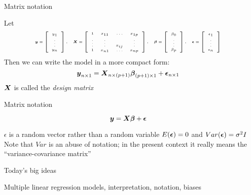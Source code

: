 \documentclass[table]{beamer}\usepackage[]{graphicx}\usepackage[]{color}
\begin{document}
\begin{frame}{Matrix notation}

\bi
	\myitem Let
	\begin{displaymath}\tiny
	\boldsymbol{y} = \left[
		\begin{array}{c}
		y_1 \\
		\vdots \\
		y_n \\
		\end{array}
    		\right],\quad
	\boldsymbol{X} = \left[
		\begin{array}{cccc}
		1 & x_{11} & \hdots & x_{1p} \\
		\vdots & \vdots & x_{ij} & \vdots \\
		1 & x_{n1} & \hdots & x_{np} \\
		\end{array}
		\right], \quad
	\boldsymbol{\beta} = \left[
		\begin{array}{c}
		\beta_0 \\
		\vdots \\
		\beta_p \\
		\end{array}
		\right], \quad
         \boldsymbol{\epsilon} = \left[
		\begin{array}{c}
		\epsilon_1 \\
		\vdots \\
		\epsilon_n \\
		\end{array}
		\right]
	\end{displaymath}
	\bigskip
	\myitem Then we can write the model in a more compact form:
	$${\boldsymbol{y}}_{n \times 1} = {\boldsymbol{X}}_{n \times (p+1)}{\boldsymbol{\beta}}_{(p+1) \times 1} + {\boldsymbol{\epsilon}}_{n \times 1}$$
	\myitem $\boldsymbol{X}$ is called the \emph{design matrix}
\ei

\end{frame}



\begin{frame}{Matrix notation}

$$\boldsymbol{y} = \boldsymbol{X}\boldsymbol{\beta} + \boldsymbol{\epsilon}$$

\bi
	\myitem $\epsilon$ is a random vector rather than a random variable
	\bigskip
	\myitem $E(\boldsymbol{\epsilon}) = 0$ and $Var(\boldsymbol{\epsilon}) = \sigma^2I$
	\bigskip
	\myitem Note that $Var$ is an abuse of notation; in the present context it really means the ``variance-covariance matrix''
\ei

\end{frame}



\begin{frame}{Today's big ideas}

\bi
        \myitem Multiple linear regression models, interpretation, notation, biases
\ei

\end{frame}
\end{document}
